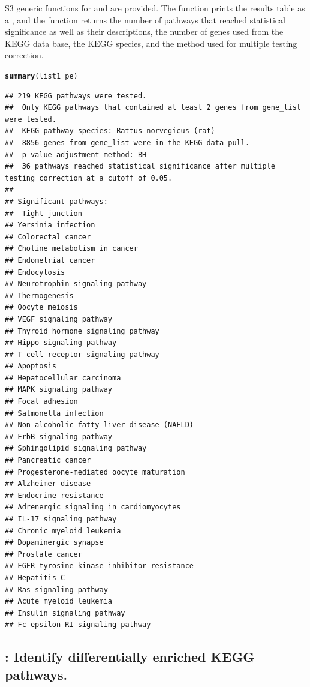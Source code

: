 \documentclass[article]{jss}\usepackage[]{graphicx}\usepackage[]{color}
\makeatletter
\newcommand{\hlstd}[1]{\textcolor[rgb]{0.345,0.345,0.345}{#1}}%
\newcommand{\hlkwd}[1]{\textcolor[rgb]{0.737,0.353,0.396}{\textbf{#1}}}%
\newenvironment{kframe}{%
 \def\at@end@of@kframe{}%
 \ifinner\ifhmode%
  \def\at@end@of@kframe{\end{minipage}}%
  \begin{minipage}{\columnwidth}%
 \fi\fi%
 \def\FrameCommand##1{\hskip\@totalleftmargin \hskip-\fboxsep
 \colorbox{shadecolor}{##1}\hskip-\fboxsep
     \hskip-\linewidth \hskip-\@totalleftmargin \hskip\columnwidth}%
 \MakeFramed {\advance\hsize-\width
   \@totalleftmargin\z@ \linewidth\hsize
   \@setminipage}}%
 {\par\unskip\endMakeFramed%
 \at@end@of@kframe}
\newenvironment{knitrout}{}{} %
\makeatother
\begin{document}
S3 generic functions for  and  are provided.
The  function prints the results table as a , and the
 function returns the number of pathways that reached statistical
significance as well as their descriptions, the number of genes used from the
KEGG data base, the KEGG species, and the method used for multiple testing
correction.

\begin{knitrout}
\color{fgcolor}\begin{kframe}
\begin{alltt}
\hlkwd{summary}\hlstd{(list1_pe)}
\end{alltt}
\begin{verbatim}
## 219 KEGG pathways were tested. 
##  Only KEGG pathways that contained at least 2 genes from gene_list were tested. 
##  KEGG pathway species: Rattus norvegicus (rat)
##  8856 genes from gene_list were in the KEGG data pull. 
##  p-value adjustment method: BH
##  36 pathways reached statistical significance after multiple testing correction at a cutoff of 0.05. 
##  
## Significant pathways: 
##  Tight junction
## Yersinia infection
## Colorectal cancer
## Choline metabolism in cancer
## Endometrial cancer
## Endocytosis
## Neurotrophin signaling pathway
## Thermogenesis
## Oocyte meiosis
## VEGF signaling pathway
## Thyroid hormone signaling pathway
## Hippo signaling pathway
## T cell receptor signaling pathway
## Apoptosis
## Hepatocellular carcinoma
## MAPK signaling pathway
## Focal adhesion
## Salmonella infection
## Non-alcoholic fatty liver disease (NAFLD)
## ErbB signaling pathway
## Sphingolipid signaling pathway
## Pancreatic cancer
## Progesterone-mediated oocyte maturation
## Alzheimer disease
## Endocrine resistance
## Adrenergic signaling in cardiomyocytes
## IL-17 signaling pathway
## Chronic myeloid leukemia
## Dopaminergic synapse
## Prostate cancer
## EGFR tyrosine kinase inhibitor resistance
## Hepatitis C
## Ras signaling pathway
## Acute myeloid leukemia
## Insulin signaling pathway
## Fc epsilon RI signaling pathway
\end{verbatim}
\end{kframe}
\end{knitrout}

\subsection{: Identify differentially enriched KEGG pathways.}
\end{document}

